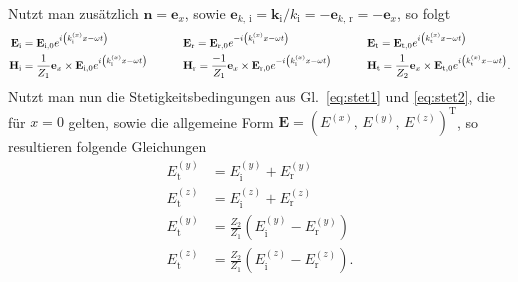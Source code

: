 Nutzt man zusätzlich $\mathbf{n} = \mathbf{e}_{x}$, sowie
$\mathbf{e}_{k,\,\text{i}} = \mathbf{k}_{\text{i}} / k_{\text{i}} = -\mathbf{e}_{k,\,\text{r}} = -\mathbf{e}_{x}$,
so folgt
\begin{alignat}{3}
    \mathbf{E}_{\text{i}} & = \mathbf{E}_{\text{i},0}e^{i\left(k^{(x)}_{\text{i}}x-\omega t\right)}
    \hspace{0.8cm}        &                                                                                                            & \mathbf{E}_{\text{r}} = \mathbf{E}_{\text{r},0}e^{-i\left(k^{(x)}_{\text{i}}x-\omega t\right)}
    \hspace{0.8cm}        &                                                                                                            & \mathbf{E}_{\text{t}} = \mathbf{E}_{\text{t},0}e^{i\left(k^{(x)}_{\text{t}}x-\omega t\right)}                                      \\
    \mathbf{H}_{\text{i}} & = \frac{1}{Z_{1}}\mathbf{e}_{x}\times\mathbf{E}_{\text{i},0}e^{i\left(k^{(x)}_{\text{i}}x-\omega t\right)}
    \hspace{0.8cm}        &                                                                                                            & \mathbf{H}_{\text{r}} = \frac{-1}{Z_{1}}\mathbf{e}_{x}\times\mathbf{E}_{\text{r},0}e^{-i\left(k^{(x)}_{\text{i}}x-\omega t\right)}
    \hspace{0.8cm}        &                                                                                                            & \mathbf{H}_{\text{t}} = \frac{1}{Z_{2}}\mathbf{e}_{x}\times\mathbf{E}_{\text{t},0}e^{i\left(k^{(x)}_{\text{t}}x-\omega t\right)}.
\end{alignat}
Nutzt man nun die Stetigkeitsbedingungen aus Gl.~\eqref{eq:stet1} und \eqref{eq:stet2}, die für $x=0$ gelten, sowie
die allgemeine Form $\mathbf{E} = \left(E^{(x)},\,E^{(y)},\,E^{(z)}\right)^{\text{T}}$, so resultieren folgende
Gleichungen
\begin{align}
    E^{(y)}_{\text{t}} & = E^{(y)}_{\text{i}} + E^{(y)}_{\text{r}}                                  \\
    E^{(z)}_{\text{t}} & = E^{(z)}_{\text{i}} + E^{(z)}_{\text{r}}                                  \\
    E^{(y)}_{\text{t}} & = \frac{Z_{2}}{Z_{1}}\left(E^{(y)}_{\text{i}} - E^{(y)}_{\text{r}}\right)  \\
    E^{(z)}_{\text{t}} & = \frac{Z_{2}}{Z_{1}}\left(E^{(z)}_{\text{i}} - E^{(z)}_{\text{r}}\right).
\end{align}
